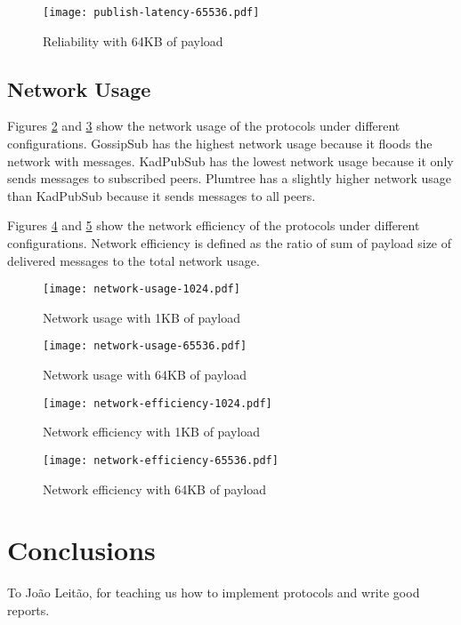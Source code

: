 \documentclass[sigconf]{acmart}
\begin{document}
\begin{figure}[htp]
    \centering
    \texttt{[image: publish-latency-65536.pdf]}
    \caption{Reliability with 64KB of payload}
    \label{fig:publish-latency-65536}
\end{figure}

\subsection{Network Usage}
Figures \ref{fig:network-usage-1024} and \ref{fig:network-usage-65536} show the network usage of the protocols under different configurations. GossipSub has the highest network usage because it floods the network with messages. KadPubSub has the lowest network usage because it only sends messages to subscribed peers. Plumtree has a slightly higher network usage than KadPubSub because it sends messages to all peers.

Figures \ref{fig:network-efficiency-1024} and \ref{fig:network-efficiency-65536} show the network efficiency of the protocols under different configurations.
Network efficiency is defined as the ratio of sum of payload size of delivered messages to the total network usage.

\begin{figure}[htp]
    \centering
    \texttt{[image: network-usage-1024.pdf]}
    \caption{Network usage with 1KB of payload}
    \label{fig:network-usage-1024}
\end{figure}

\begin{figure}[htp]
    \centering
    \texttt{[image: network-usage-65536.pdf]}
    \caption{Network usage with 64KB of payload}
    \label{fig:network-usage-65536}
\end{figure}

\begin{figure}[htp]
    \centering
    \texttt{[image: network-efficiency-1024.pdf]}
    \caption{Network efficiency with 1KB of payload}
    \label{fig:network-efficiency-1024}
\end{figure}

\begin{figure}[htp]
    \centering
    \texttt{[image: network-efficiency-65536.pdf]}
    \caption{Network efficiency with 64KB of payload}
    \label{fig:network-efficiency-65536}
\end{figure}

\section{Conclusions}

\begin{acks}
    To João Leitão, for teaching us how to implement protocols and write good reports.
\end{acks}



\end{document}
